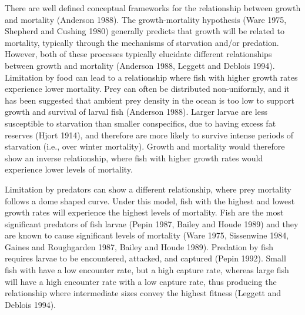 \documentclass[]{book}
\begin{document}
There are well defined conceptual frameworks for the relationship
between growth and mortality (Anderson 1988). The growth-mortality
hypothesis (Ware 1975, Shepherd and Cushing 1980) generally predicts
that growth will be related to mortality, typically through the
mechanisms of starvation and/or predation. However, both of these
processes typically elucidate different relationships between growth and
mortality (Anderson 1988, Leggett and Deblois 1994). Limitation by food
can lead to a relationship where fish with higher growth rates
experience lower mortality. Prey can often be distributed non-uniformly,
and it has been suggested that ambient prey density in the ocean is too
low to support growth and survival of larval fish (Anderson 1988).
Larger larvae are less susceptible to starvation than smaller
conspecifics, due to having excess fat reserves (Hjort 1914), and
therefore are more likely to survive intense periods of starvation
(i.e., over winter mortality). Growth and mortality would therefore show
an inverse relationship, where fish with higher growth rates would
experience lower levels of mortality.

Limitation by predators can show a different relationship, where prey
mortality follows a dome shaped curve. Under this model, fish with the
highest and lowest growth rates will experience the highest levels of
mortality. Fish are the most significant predators of fish larvae (Pepin
1987, Bailey and Houde 1989) and they are known to cause significant
levels of mortality (Ware 1975, Sissenwine 1984, Gaines and Roughgarden
1987, Bailey and Houde 1989). Predation by fish requires larvae to be
encountered, attacked, and captured (Pepin 1992). Small fish with have a
low encounter rate, but a high capture rate, whereas large fish will
have a high encounter rate with a low capture rate, thus producing the
relationship where intermediate sizes convey the highest fitness
(Leggett and Deblois 1994).
\end{document}
